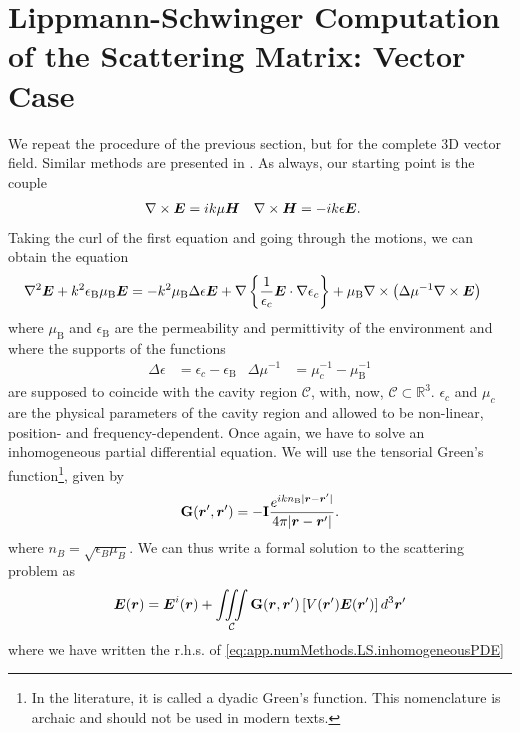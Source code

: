 \section{Lippmann-Schwinger Computation of the Scattering Matrix: Vector Case}
We repeat the procedure of the previous section, but for the complete 3D vector
field. Similar methods are presented in \cite{deL2013,FAL2013}. As always, 
our starting point is the couple
	\begin{align}
		\nabla\times\boldsymbol{E}	& =ik\mu\boldsymbol{H}	& \nabla\times\boldsymbol{H}	&=-ik\epsilon\boldsymbol{E}.
	\end{align}
Taking the curl of the first equation and going through the motions, 
we can obtain the equation
	\begin{align}
		\label{eq:app.numMethods.LS.inhomogeneousPDE}
		\nabla^2\boldsymbol{E}+k^2\epsilon_\text{B}\mu_\text{B}\boldsymbol{E}	&=	-k^2\mu_\text{B}\Delta\epsilon\boldsymbol{E}
																	+\nabla\left\{\frac{1}{\epsilon_c}\boldsymbol{E}\cdot\nabla\epsilon_c\right\}	
																	+\mu_\text{B}\nabla\times\left(\Delta\mu^{-1}\nabla\times\boldsymbol{E}\right)
	\end{align}
where $\mu_\text{B}$ and $\epsilon_\text{B}$ are the permeability and permittivity
of the environment and where the supports of the functions
	\begin{align}
		\Delta\epsilon &= \epsilon_c-\epsilon_\text{B}	&	\Delta\mu^{-1}	&=\mu_c^{-1}-\mu_\text{B}^{-1}
	\end{align}
are supposed to coincide with the cavity region $\mathcal{C}$, 
with, now, $\mathcal{C}\subset\mathbb{R}^3$. $\epsilon_c$ 
and $\mu_c$ are the physical parameters of the cavity 
region and allowed to be non-linear, position- and frequency-dependent.
Once again, we have to solve an inhomogeneous partial differential equation.
We will use the tensorial Green's function\footnote{In the literature, it is called a dyadic 
Green's function. This nomenclature is archaic and should not be used in 
modern texts.}, given by \cite{NOV2012}
	\begin{equation}
		\mathbf{G}(\boldsymbol{r}',\boldsymbol{r}') = -\mathbf{I}\frac{e^{ikn_\text{B}|\boldsymbol{r}-\boldsymbol{r}'|}}{4\pi|\boldsymbol{r}-\boldsymbol{r}'|}.
	\end{equation}
where $n_B=\sqrt{\epsilon_B\mu_B}$. We can thus write a formal solution 
to the scattering problem as
	\begin{equation}
		\boldsymbol{E}(\boldsymbol{r}) = \boldsymbol{E}^i(\boldsymbol{r})
						+\mathop{\iiint}_\mathcal{C}\mathbf{G}(\boldsymbol{r},\boldsymbol{r}')\left[V(\boldsymbol{r}')\boldsymbol{E}(\boldsymbol{r}')\right]d^3\boldsymbol{r}'
	\end{equation}
where we have written the r.h.s. of \eqref{eq:app.numMethods.LS.inhomogeneousPDE}
